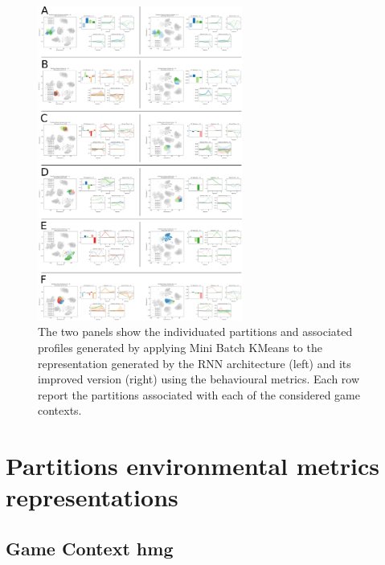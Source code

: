 \begin{figure}[!htb]
\includegraphics[width=0.6\textwidth]{images/appendix_D/clust_beha_all.png}
\centering
\caption[Partitions of the representations generated by the RNN architecture and its improved version from the behavioural metrics]{The two panels show the individuated partitions and associated profiles generated by applying Mini Batch KMeans to the representation generated by the RNN architecture (left) and its improved version (right) using the behavioural metrics. Each row report the partitions associated with each of the considered game contexts.}
\end{figure}
\FloatBarrier

\section{Partitions environmental metrics representations}
\label{partitions_environmental}

\subsection{Game Context hmg}
\label{env_clust_hmg}


